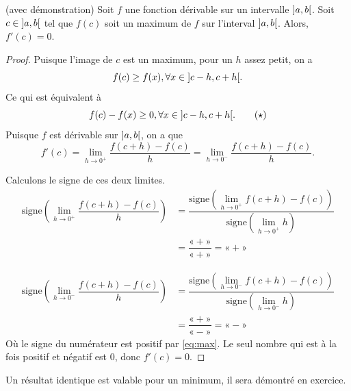 \documentclass[a4paper,12pt]{article}
\begin{document}
\begin{prop}[label=prop:max]
	(avec démonstration)
	\tcblower
	Soit $f$ une fonction dérivable sur un intervalle $\ointerval{a}{b}$. Soit $c\in \ointerval{a}{b}$ tel que $f(c)$ soit un maximum de $f$ sur l'interval $\ointerval{a}{b}$. Alors, $f'(c)=0$.

	\begin{proof}
	Puisque l'image de $c$ est un maximum, pour un $h$ assez petit, on a
	\[f(c)\geq f(x),  \forall x\in \ointerval{c-h}{c+h}.\]	
	Ce qui est équivalent à 
	\begin{equation}
	f(c)-f(x)\geq 0,  \forall x\in \ointerval{c-h}{c+h}.
	\tag{$\star$}
	\label{eq:max}
\end{equation}
	Puisque $f$ est dérivable sur $\ointerval{a}{b}$, on a que  
	\[f'(c)=\lim_{h\to 0^+}\dfrac{f(c+h)-f(c)}{h}=\lim_{h\to 0^-}\dfrac{f(c+h)-f(c)}{h}.\]

	Calculons le signe de ces deux limites.
	\begin{align*}
		\text{signe}\left(\lim_{h\to 0^+}\dfrac{f(c+h)-f(c)}{h}\right)&=\dfrac{\text{signe}\left(\displaystyle{\lim_{h\to 0^+}}f(c+h)-f(c)\right)}{\text{signe}\left(\displaystyle{\lim_{h\to 0^+}}h\right)}\\
		&=\dfrac{«+»}{«+»}=«+»
\end{align*}

	\begin{align*}
		\text{signe}\left(\lim_{h\to 0^-}\dfrac{f(c+h)-f(c)}{h}\right)&=\dfrac{\text{signe}\left(\displaystyle{\lim_{h\to 0^-}}f(c+h)-f(c)\right)}{\text{signe}\left(\displaystyle{\lim_{h\to 0^-}}h\right)}\\
		&=\dfrac{«+»}{«-»}=«-»
\end{align*}
Où le signe du numérateur est positif par \eqref{eq:max}. 
	Le seul nombre qui est à la fois positif et négatif est $0$, donc $f'(c)=0$.
	\end{proof}
\end{prop}
\begin{remarque}
	\tcblower
Un résultat identique est valable pour un minimum, il sera démontré en exercice.
\end{remarque}
\end{document}
